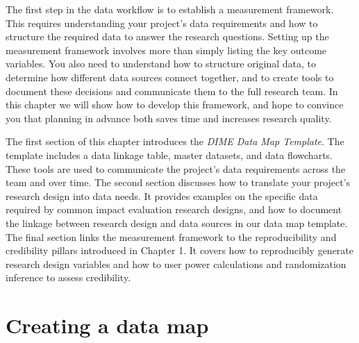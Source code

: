 
\begin{fullwidth}
The first step in the data workflow is to establish a measurement framework.
This requires understanding your project's data requirements
and how to structure the required data to answer the research questions.
Setting up the measurement framework involves more than
simply listing the key outcome variables.
You also need to understand how to structure original data,
to determine how different data sources connect together,
and to create tools to document these decisions and 
communicate them to the full research team.
In this chapter we will show how to develop this framework,
and hope to convince you that planning in advance both
saves time and increases research quality.

The first section of this chapter 
introduces the \textit{DIME Data Map Template}.
The template includes a data linkage table,
master datasets, and data flowcharts.
These tools are used to communicate the project's data requirements
across the team and over time.
The second section discusses how to 
translate your project's research design into data needs.
It provides examples on the specific data required by 
common impact evaluation research designs,
and how to document the linkage between 
research design and data sources in our data map template.
The final section links the measurement framework to the 
reproducibility and credibility pillars introduced in Chapter 1. 
It covers how to reproducibly generate research design variables
and how to user power calculations and randomization inference
to assess credibility.


\end{fullwidth}


\section{Creating a data map}

